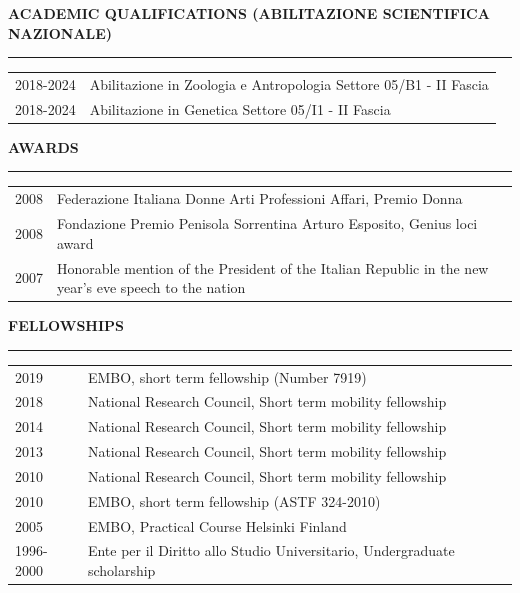 \documentclass[openany]{book}
\begin{document}
\vspace{0.4cm}
\noindent
\MakeUppercase{\textbf{Academic Qualifications (Abilitazione Scientifica Nazionale) }} \vspace{0.2cm}
\sectionlineskip
\hrule
\vspace{0.2cm}
\noindent
\begin{tabular}{ l l  }
2018-2024 & Abilitazione in Zoologia e Antropologia Settore 05/B1 - II Fascia\\
2018-2024 & Abilitazione in Genetica Settore 05/I1 - II Fascia\\
\end{tabular}

\vspace{0.4cm}
\noindent
\MakeUppercase{\textbf{Awards}} \vspace{0.2cm}
\sectionlineskip
\hrule
\vspace{0.2cm}
\noindent
\begin{tabular}{ l l  }
2008 &	Federazione Italiana Donne Arti Professioni Affari, Premio Donna \\
2008 &  Fondazione Premio Penisola Sorrentina Arturo Esposito, Genius loci award\\
2007 & Honorable mention of the President of the Italian Republic in the new year’s eve speech to the nation\\
\end{tabular}
\newline 

\vspace{0.4cm}
\noindent
\MakeUppercase{\textbf{Fellowships}} \vspace{0.2cm}
\sectionlineskip
\hrule
\vspace{0.2cm}
\noindent
\begin{tabular}{ l l  }
2019 & EMBO, short term fellowship (Number 7919) \\
2018 & National Research Council, Short term mobility fellowship\\
2014 & National Research Council, Short term mobility fellowship\\
2013 &	National Research Council, Short term mobility fellowship\\
2010 & National Research Council, Short term mobility fellowship\\
2010 &	EMBO, short term fellowship (ASTF 324-2010)\\
2005 &	EMBO, Practical Course Helsinki Finland\\
1996-2000 & Ente per il Diritto allo Studio Universitario, Undergraduate scholarship \\
\end{tabular}
\newline
\end{document}
